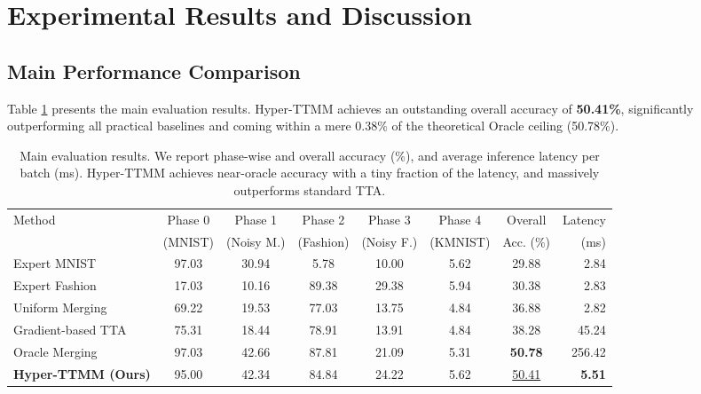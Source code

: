 \documentclass{article}
\theoremstyle{plain}
\theoremstyle{definition}
\theoremstyle{remark}
\begin{document}
\section{Experimental Results and Discussion}

\subsection{Main Performance Comparison}

Table \ref{tab:main_results} presents the main evaluation results. Hyper-TTMM achieves an outstanding overall accuracy of \textbf{50.41\%}, significantly outperforming all practical baselines and coming within a mere 0.38\% of the theoretical Oracle ceiling (50.78\%).

\begin{table}[t]
\caption{Main evaluation results. We report phase-wise and overall accuracy (\%), and average inference latency per batch (ms). Hyper-TTMM achieves near-oracle accuracy with a tiny fraction of the latency, and massively outperforms standard TTA.}
\label{tab:main_results}
\vskip 0.15in
\begin{center}
\begin{small}
\begin{sc}
\setlength{\tabcolsep}{3.5pt}
\begin{tabular}{lccccccr}
\toprule
Method & Phase 0 & Phase 1 & Phase 2 & Phase 3 & Phase 4 & Overall & Latency \\
& (MNIST) & (Noisy M.) & (Fashion) & (Noisy F.) & (KMNIST) & Acc. (\%) & (ms) \\
\midrule
Expert MNIST & 97.03 & 30.94 & 5.78 & 10.00 & 5.62 & 29.88 & 2.84 \\
Expert Fashion & 17.03 & 10.16 & 89.38 & 29.38 & 5.94 & 30.38 & 2.83 \\
Uniform Merging & 69.22 & 19.53 & 77.03 & 13.75 & 4.84 & 36.88 & 2.82 \\
Gradient-based TTA & 75.31 & 18.44 & 78.91 & 13.91 & 4.84 & 38.28 & 45.24 \\
\midrule
Oracle Merging & 97.03 & 42.66 & 87.81 & 21.09 & 5.31 & \textbf{50.78} & 256.42 \\
\textbf{Hyper-TTMM (Ours)} & 95.00 & 42.34 & 84.84 & 24.22 & 5.62 & \underline{50.41} & \textbf{5.51} \\
\bottomrule
\end{tabular}
\end{sc}
\end{small}
\end{center}
\vskip -0.1in
\end{table}
\end{document}
